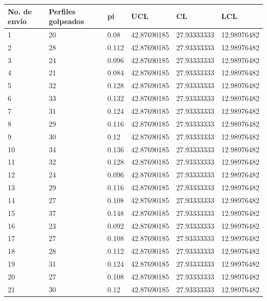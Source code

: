 \documentclass{article}
\theoremstyle{mytheoremstyle}
\theoremstyle{mytheoremstyle}
\theoremstyle{myproblemstyle}
\begin{document}
\begin{table}[H]
    \centering
    \begin{tabular}{|l|l|l|l|l|l|}
    \hline
        No. de envío & Perfiles golpeados & pi & UCL & CL & LCL \\ \hline
        1 & 20 & 0.08 & 42.87690185 & 27.93333333 & 12.98976482 \\ \hline
        2 & 28 & 0.112 & 42.87690185 & 27.93333333 & 12.98976482 \\ \hline
        3 & 24 & 0.096 & 42.87690185 & 27.93333333 & 12.98976482 \\ \hline
        4 & 21 & 0.084 & 42.87690185 & 27.93333333 & 12.98976482 \\ \hline
        5 & 32 & 0.128 & 42.87690185 & 27.93333333 & 12.98976482 \\ \hline
        6 & 33 & 0.132 & 42.87690185 & 27.93333333 & 12.98976482 \\ \hline
        7 & 31 & 0.124 & 42.87690185 & 27.93333333 & 12.98976482 \\ \hline
        8 & 29 & 0.116 & 42.87690185 & 27.93333333 & 12.98976482 \\ \hline
        9 & 30 & 0.12 & 42.87690185 & 27.93333333 & 12.98976482 \\ \hline
        10 & 34 & 0.136 & 42.87690185 & 27.93333333 & 12.98976482 \\ \hline
        11 & 32 & 0.128 & 42.87690185 & 27.93333333 & 12.98976482 \\ \hline
        12 & 24 & 0.096 & 42.87690185 & 27.93333333 & 12.98976482 \\ \hline
        13 & 29 & 0.116 & 42.87690185 & 27.93333333 & 12.98976482 \\ \hline
        14 & 27 & 0.108 & 42.87690185 & 27.93333333 & 12.98976482 \\ \hline
        15 & 37 & 0.148 & 42.87690185 & 27.93333333 & 12.98976482 \\ \hline
        16 & 23 & 0.092 & 42.87690185 & 27.93333333 & 12.98976482 \\ \hline
        17 & 27 & 0.108 & 42.87690185 & 27.93333333 & 12.98976482 \\ \hline
        18 & 28 & 0.112 & 42.87690185 & 27.93333333 & 12.98976482 \\ \hline
        19 & 31 & 0.124 & 42.87690185 & 27.93333333 & 12.98976482 \\ \hline
        20 & 27 & 0.108 & 42.87690185 & 27.93333333 & 12.98976482 \\ \hline
        21 & 30 & 0.12 & 42.87690185 & 27.93333333 & 12.98976482 \\ \hline

\end{tabular}
\end{table}
\end{document}
